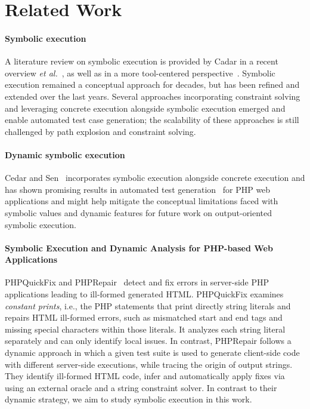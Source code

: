 \section{Related Work} \label{sec:related_work}

\paragraph{Symbolic execution}
A literature review on symbolic execution is provided by Cadar in a
recent overview {\em et al.}~\cite{CadarSen2013}, as well as in a more
tool-centered perspective~\cite{Cadar2011}.
%
Symbolic execution \cite{King1976,Darringer1978} remained a
conceptual approach for decades, but has been refined and extended
over the last years. Several approaches incorporating constraint
solving and leveraging concrete execution alongside symbolic execution
emerged and enable automated test case generation; the scalability of
these approaches is still challenged by path explosion and constraint
solving.

\paragraph{Dynamic symbolic execution} Cedar and Sen~\cite{CadarSen2013} incorporates symbolic execution
alongside concrete execution and has shown promising results in
automated test
generation~\cite{artzi_finding_2008,artzi_finding_2010,DynamicWassermann}
for PHP web applications and might help mitigate the conceptual
limitations faced with symbolic values and dynamic features for future
work on output-oriented symbolic execution.

\paragraph{Symbolic Execution and Dynamic Analysis for PHP-based Web Applications}
PHPQuickFix and PHPRepair~\cite{ibm-icse12} detect and fix errors in
server-side PHP applications leading to ill-formed generated HTML.
PHPQuickFix examines {\em constant prints}, i.e., the PHP statements
that print directly string literals and repairs HTML ill-formed
errors, such as mismatched start and end tags and missing special
characters within those literals. It analyzes each string literal
separately and can only identify local issues. In contrast, PHPRepair
follows a dynamic approach in which a given test suite is used to
generate client-side code with different server-side executions, while
tracing the origin of output strings.
They identify ill-formed HTML code, infer and automatically apply
fixes via using an external oracle and a string constraint solver.  In
contrast to their dynamic strategy, we aim to study symbolic execution
in this work.

